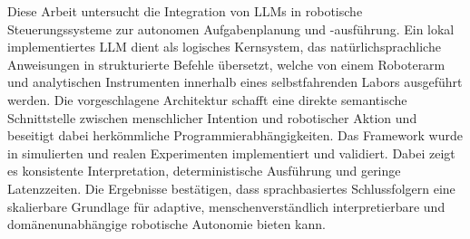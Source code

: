 
\begin{zusammenfassung}

Diese Arbeit untersucht die Integration von LLMs in robotische Steuerungssysteme zur autonomen Aufgabenplanung und -ausführung. Ein lokal implementiertes LLM dient als logisches Kernsystem, das natürlichsprachliche Anweisungen in strukturierte Befehle übersetzt, welche von einem Roboterarm und analytischen Instrumenten innerhalb eines selbstfahrenden Labors ausgeführt werden. Die vorgeschlagene Architektur schafft eine direkte semantische Schnittstelle zwischen menschlicher Intention und robotischer Aktion und beseitigt dabei herkömmliche Programmierabhängigkeiten. Das Framework wurde in simulierten und realen Experimenten implementiert und validiert. Dabei zeigt es konsistente Interpretation, deterministische Ausführung und geringe Latenzzeiten. Die Ergebnisse bestätigen, dass sprachbasiertes Schlussfolgern eine skalierbare Grundlage für adaptive, menschenverständlich interpretierbare und domänenunabhängige robotische Autonomie bieten kann.

\end{zusammenfassung}

